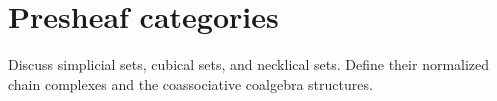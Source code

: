 
\section{Presheaf categories}

Discuss simplicial sets, cubical sets, and necklical sets. Define their normalized chain complexes and the coassociative coalgebra structures.

%
%
%
